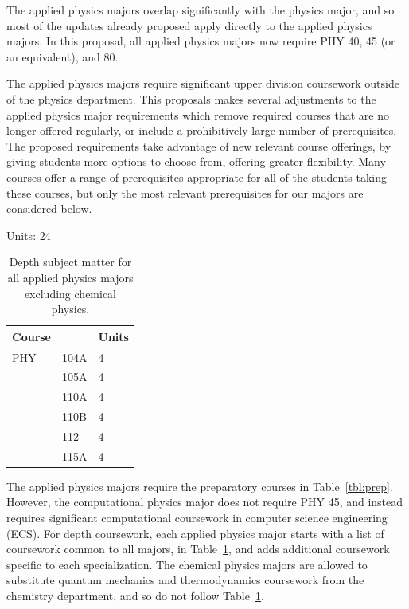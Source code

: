 \documentclass[12pt]{article}
\begin{document}
The applied physics majors overlap significantly with the physics
major, and so most of the updates already proposed apply directly to
the applied physics majors.  In this proposal, all applied physics
majors now require PHY 40, 45 (or an equivalent), and 80.

The applied physics majors require significant upper division
coursework outside of the physics department.  This proposals makes
several adjustments to the applied physics major requirements which
remove required courses that are no longer offered regularly, or
include a prohibitively large number of prerequisites.  The proposed
requirements take advantage of new relevant course offerings, by
giving students more options to choose from, offering greater
flexibility.  Many courses offer a range of prerequisites appropriate
for all of the students taking these courses, but only the most
relevant prerequisites for our majors are considered below.

\begin{table}[htbp]
\caption{\label{tbl:depth-applied} Depth subject matter for
  all applied physics majors excluding chemical physics.}
\noindent
\vskip 0.25cm
\begin{center}
\noindent
Units:  24\\
\begin{tabular}{|lll|}
\hline
Course & & Units \\
\hline
PHY & 104A   & 4 \\  
    & 105A   & 4 \\ 
    & 110A   & 4 \\ 
    & 110B   & 4 \\
    & 112    & 4 \\
    & 115A   & 4 \\ 
\hline
\end{tabular}
\end{center}
\end{table}

The applied physics majors require the preparatory courses in
Table~\ref{tbl:prep}.  However, the computational physics major does
not require PHY 45, and instead requires significant computational
coursework in computer science engineering (ECS).  For depth
coursework, each applied physics major starts with a list of
coursework common to all majors, in Table~\ref{tbl:depth-applied}, and
adds additional coursework specific to each specialization.  The
chemical physics majors are allowed to substitute quantum mechanics
and thermodynamics coursework from the chemistry department, and so do
not follow Table~\ref{tbl:depth-applied}.
\end{document}
